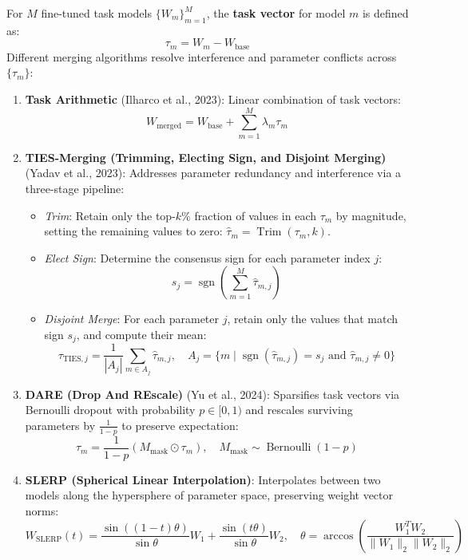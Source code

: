 \documentclass[11pt,a4paper]{article}
\theoremstyle{definition}
\begin{document}
For $M$ fine-tuned task models $\{W_m\}_{m=1}^M$, the \textbf{task vector} for model $m$ is defined as:
{\boldmath
\begin{equation}
\tau_m = W_m - W_{\text{base}}
\end{equation}
}
Different merging algorithms resolve interference and parameter conflicts across $\{\tau_m\}$:
\begin{enumerate}
    \item \textbf{Task Arithmetic} (Ilharco et al., 2023): Linear combination of task vectors:
    {\boldmath
    \begin{equation}
    W_{\text{merged}} = W_{\text{base}} + \sum_{m=1}^M \lambda_m \tau_m
    \end{equation}
    }
    \item \textbf{TIES-Merging (Trimming, Electing Sign, and Disjoint Merging)} (Yadav et al., 2023): Addresses parameter redundancy and interference via a three-stage pipeline:
    \begin{itemize}
        \item \emph{Trim}: Retain only the top-$k\%$ fraction of values in each $\tau_m$ by magnitude, setting the remaining values to zero: $\hat{\tau}_m = \operatorname{Trim}(\tau_m, k)$.
        \item \emph{Elect Sign}: Determine the consensus sign for each parameter index $j$:
        {\boldmath
        \begin{equation}
        s_j = \operatorname{sgn}\left(\sum_{m=1}^M \hat{\tau}_{m, j}\right)
        \end{equation}
        }
        \item \emph{Disjoint Merge}: For each parameter $j$, retain only the values that match sign $s_j$, and compute their mean:
        {\boldmath
        \begin{equation}
        \tau_{\text{TIES}, j} = \frac{1}{|A_j|} \sum_{m \in A_j} \hat{\tau}_{m, j}, \quad A_j = \{m \mid \operatorname{sgn}(\hat{\tau}_{m, j}) = s_j \text{ and } \hat{\tau}_{m, j} \neq 0\}
        \end{equation}
        }
    \end{itemize}
    \item \textbf{DARE (Drop And REscale)} (Yu et al., 2024): Sparsifies task vectors via Bernoulli dropout with probability $p \in [0, 1)$ and rescales surviving parameters by $\frac{1}{1-p}$ to preserve expectation:
    {\boldmath
    \begin{equation}
    \hat{\tau}_m = \frac{1}{1 - p} \left( M_{\text{mask}} \odot \tau_m \right), \quad M_{\text{mask}} \sim \operatorname{Bernoulli}(1 - p)
    \end{equation}
    }
    \item \textbf{SLERP (Spherical Linear Interpolation)}: Interpolates between two models along the hypersphere of parameter space, preserving weight vector norms:
    {\boldmath
    \begin{equation}
    W_{\text{SLERP}}(t) = \frac{\sin((1 - t)\theta)}{\sin \theta} W_1 + \frac{\sin(t\theta)}{\sin \theta} W_2, \quad \theta = \arccos\left(\frac{W_1^T W_2}{\|W_1\|_2 \|W_2\|_2}\right)
    \end{equation}
    }
\end{enumerate}
\end{document}
